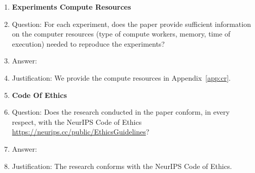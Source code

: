 \begin{enumerate}
\item {\bf Experiments Compute Resources}
    \item[] Question: For each experiment, does the paper provide sufficient information on the computer resources (type of compute workers, memory, time of execution) needed to reproduce the experiments?
    \item[] Answer: \answerYes{} %
    \item[] Justification: We provide the compute resources in Appendix~\ref{app:cr}.
    
\item {\bf Code Of Ethics}
    \item[] Question: Does the research conducted in the paper conform, in every respect, with the NeurIPS Code of Ethics \url{https://neurips.cc/public/EthicsGuidelines}?
    \item[] Answer: \answerYes{} %
    \item[] Justification: The research conforms with the NeurIPS Code of Ethics.



\end{enumerate}
